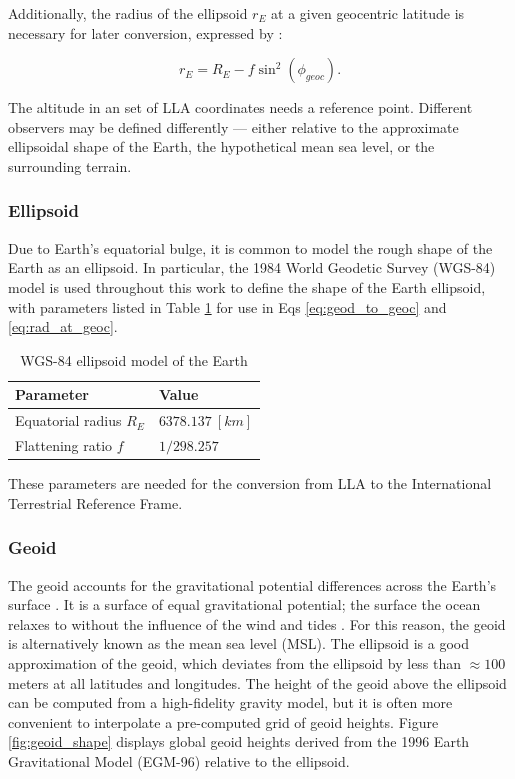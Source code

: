 Additionally, the radius of the ellipsoid $r_E$ at a given geocentric latitude is necessary for later conversion, expressed by \cite{frueh2019notes}:

\begin{equation} \label{eq:rad_at_geoc}
  r_E = R_E - f \sin^2 \left( \phi_{geoc} \right).
\end{equation}

The altitude in an set of LLA coordinates needs a reference point. Different observers may be defined differently --- either relative to the approximate ellipsoidal shape of the Earth, the hypothetical mean sea level, or the surrounding terrain.

\subsubsection{Ellipsoid}

Due to Earth's equatorial bulge, it is common to model the rough shape of the Earth as an ellipsoid. In particular, the 1984 World Geodetic Survey (WGS-84) model is used throughout this work to define the shape of the Earth ellipsoid, with parameters listed in Table \ref{tb:wgs84} for use in Eqs \ref{eq:geod_to_geoc} and \ref{eq:rad_at_geoc}.

\begin{table}[ht]
  \centering
  \begin{tabular}{|l|l|}
  \hline
  \textbf{Parameter} & \textbf{Value}              \\ \hline
  Equatorial radius $R_E$             & $6378.137 \: [km]$ \\ \hline
  Flattening ratio $f$                & $1 / 298.257$      \\ \hline
  \end{tabular}
  \caption{WGS-84 ellipsoid model of the Earth \cite{vallado4ed}}
  \label{tb:wgs84}
\end{table}

These parameters are needed for the conversion from LLA to the International Terrestrial Reference Frame.

\subsubsection{Geoid}

The geoid accounts for the gravitational potential differences across the Earth's surface \cite{vallado4ed}. It is a surface of equal gravitational potential; the surface the ocean relaxes to without the influence of the wind and tides \cite{vallado4ed}. For this reason, the geoid is alternatively known as the mean sea level (MSL). The ellipsoid is a good approximation of the geoid, which deviates from the ellipsoid by less than $\approx 100$ meters at all latitudes and longitudes. The height of the geoid above the ellipsoid can be computed from a high-fidelity gravity model, but it is often more convenient to interpolate a pre-computed grid of geoid heights. Figure \ref{fig:geoid_shape} displays global geoid heights derived from the 1996 Earth Gravitational Model (EGM-96) relative to the ellipsoid.

